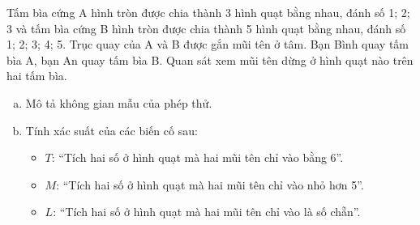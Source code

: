 \begin{bt}%
Tấm bìa cứng A hình tròn được chia thành 3 hình quạt bằng nhau, đánh số 1; 2; 3 và tấm bìa cứng B hình tròn được chia thành 5 hình quạt bằng nhau, đánh số 1; 2; 3; 4; 5. Trục quay của A và B được gắn mũi tên ở tâm. Bạn Bình quay tấm bìa A, bạn An quay tấm bìa B. Quan sát xem mũi tên dừng ở hình quạt nào trên hai tấm bìa.
\begin{enumerate}[a)]
    \item Mô tả không gian mẫu của phép thử.
    \item Tính xác suất của các biến cố sau:
    \begin{itemize}
        \item $T$: “Tích hai số ở hình quạt mà hai mũi tên chỉ vào bằng 6”.
        \item $M$: “Tích hai số ở hình quạt mà hai mũi tên chỉ vào nhỏ hơn 5”.
        \item $L$: “Tích hai số ở hình quạt mà hai mũi tên chỉ vào là số chẵn”.
    \end{itemize}
\end{enumerate}
\end{bt}
